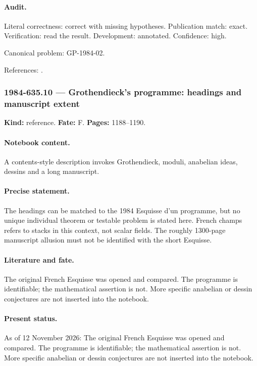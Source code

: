 \paragraph{Audit.} Literal correctness: correct with missing hypotheses. Publication match: exact. Verification: read the result. Development: annotated. Confidence: high.

\noindent Canonical problem: GP-1984-02.\par

\noindent References: \citep{gelfandgraevvilenkin1966integral}.\par

\subsubsection{1984-635.10 --- Grothendieck's programme: headings and manuscript extent}

\label{item:1984-635.10}

\noindent\textbf{Kind:} reference. \textbf{Fate:} F. \textbf{Pages:} 1188--1190.\par

\paragraph{Notebook content.} A contents-style description invokes Grothendieck, moduli, anabelian ideas, dessins and a long manuscript.

\paragraph{Precise statement.} The headings can be matched to the 1984 Esquisse d'un programme, but no unique individual theorem or testable problem is stated here. French champs refers to stacks in this context, not scalar fields. The roughly 1300-page manuscript allusion must not be identified with the short Esquisse.

\paragraph{Literature and fate.} The original French Esquisse was opened and compared. The programme is identifiable; the mathematical assertion is not. More specific anabelian or dessin conjectures are not inserted into the notebook.

\paragraph{Present status.} As of 12 November 2026: The original French Esquisse was opened and compared. The programme is identifiable; the mathematical assertion is not. More specific anabelian or dessin conjectures are not inserted into the notebook.


